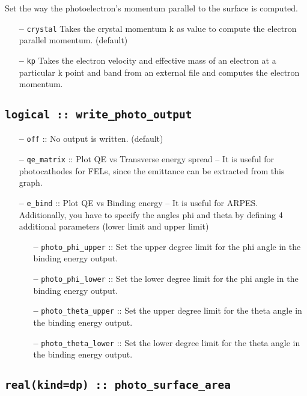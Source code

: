 \documentclass[a4paper,11pt,twoside]{book}
\begin{document}
Set the way the photoelectron's momentum parallel to the surface is computed.

\begin{itemize}
\item[{\bf --}]  \verb#crystal# Takes the crystal momentum k as value to compute the electron parallel momentum. (default)
\item[{\bf --}]  \verb#kp# Takes the electron velocity and effective mass of an electron at a particular k point and band from an external file and computes the electron momentum.
\end{itemize}

\subsection[write\_photo\_output]{\tt logical :: write\_photo\_output}

\begin{itemize}
\item[{\bf --}]  \verb#off# :: No output is written. (default)
\item[{\bf --}]  \verb#qe_matrix# :: Plot QE vs Transverse energy spread – It is useful for photocathodes for FELs, since the emittance can be extracted from this graph.
\item[{\bf --}]  \verb#e_bind# :: Plot QE vs Binding energy – It is useful for ARPES. Additionally, you have to specify the angles phi and theta by defining 4 additional parameters (lower limit and upper limit)
\begin{itemize}
\item[{\bf --}]  \verb#photo_phi_upper# :: Set the upper degree limit for the phi angle in the binding energy output.
\item[{\bf --}]  \verb#photo_phi_lower# :: Set the lower degree limit for the phi angle in the binding energy output.
\item[{\bf --}]  \verb#photo_theta_upper# :: Set the upper degree limit for the theta angle in the binding energy output.
\item[{\bf --}]  \verb#photo_theta_lower# :: Set the lower degree limit for the theta angle in the binding energy output.
\end{itemize}
\end{itemize}

\subsection[photo\_surface\_area]{\tt real(kind=dp) :: photo\_surface\_area}
\end{document}
